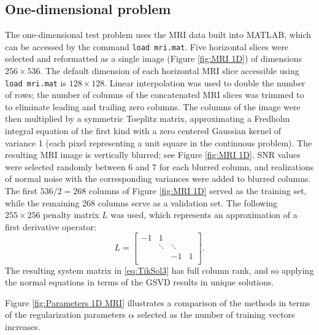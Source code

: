\documentclass[12pt]{article}
\begin{document}
\subsection{One-dimensional problem} \label{sec:1D}
The one-dimensional test problem uses the MRI data built into MATLAB, which can be accessed by the command \texttt{load mri.mat}. Five horizontal slices were selected and reformatted as a single image (Figure \ref{fig:MRI 1D}) of dimensions $256 \times 536$. The default dimension of each horizontal MRI slice accessible using \texttt{load mri.mat} is $128 \times 128$. Linear interpolation was used to double the number of rows; the number of columns of the concatenated MRI slices was trimmed to to eliminate leading and trailing zero columns. The columns of the image were then multiplied by a symmetric Toeplitz matrix, approximating a Fredholm integral equation of the first kind with a zero centered Gaussian kernel of variance 1 (each pixel representing a unit square in the continuous problem). The resulting MRI image is vertically blurred; see Figure \ref{fig:MRI 1D}. SNR values were selected randomly between 6 and 7 for each blurred column, and realizations of normal noise with the corresponding variances were added to blurred columns. The first $536/2 = 268$ columns of Figure \ref{fig:MRI 1D} served as the training set, while the remaining 268 columns serve as a validation set.  The following $255 \times 256$ penalty matrix $L$ was used, which represents an approximation of a first derivative operator:
\[L = \begin{bmatrix}
-1 & 1 & &  \\
 & \ddots &  \ddots & \\
 & & -1 & 1 \\
\end{bmatrix}.\]
The resulting system matrix in \eqref{eq:TikSol3} has full column rank, and so applying the normal equations in terms of the GSVD results in unique solutions. \par 
Figure \ref{fig:Parameters 1D MRI} illustrates a comparison of the methods in terms of the regularization parameters $\alpha$ selected as the number of training vectors increases. 
\end{document}
